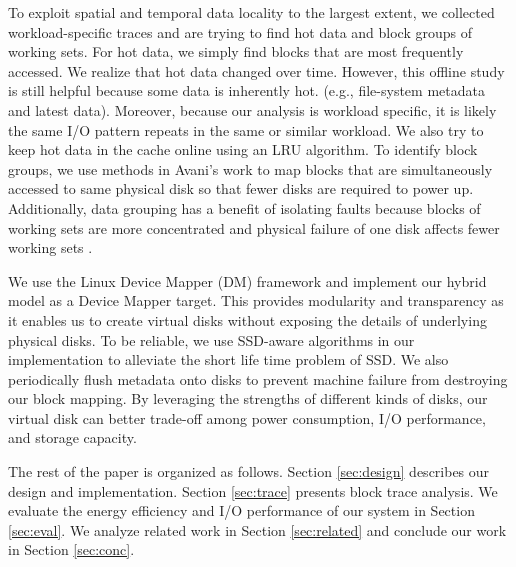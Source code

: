 
To exploit spatial and temporal data locality to the largest extent,
we collected workload-specific traces and are trying to find hot data
and block groups of working sets. For hot data, we simply find blocks
that are most frequently accessed. We realize that hot data changed
over time. However, this offline study is still helpful because some
data is inherently hot. (e.g., file-system metadata and latest data).
Moreover, because our analysis is workload specific, it is likely the
same I/O pattern repeats in the same or similar workload. We also try
to keep hot data in the cache online using an LRU algorithm. To
identify block groups, we use methods in Avani's work
\cite{Wildani_grouping} to map blocks that are simultaneously accessed
to same physical disk so that fewer disks are required to power up.
Additionally, data grouping has a benefit of isolating faults because
blocks of working sets are more concentrated and physical failure of
one disk affects fewer working sets \cite{Sivathanu_dgraid,
Wildani_grouping}. 

We use the Linux Device Mapper (DM) framework and implement our hybrid
model as a Device Mapper target. This provides modularity and
transparency as it enables us to create virtual disks without exposing
the details of underlying physical disks. To be reliable, we use
SSD-aware algorithms in our implementation to alleviate the short life
time problem of SSD. We also periodically flush metadata onto disks to
prevent machine failure from destroying our block mapping. By
leveraging the strengths of different kinds of disks, our virtual disk
can better trade-off among power consumption, I/O performance, and
storage capacity.

The rest of the paper is organized as follows. Section
\ref{sec:design} describes our design and implementation. Section
\ref{sec:trace} presents block trace analysis. We evaluate the energy
efficiency and I/O performance of our system in Section
\ref{sec:eval}. We analyze related work in Section \ref{sec:related}
and conclude our work in Section \ref{sec:conc}.

